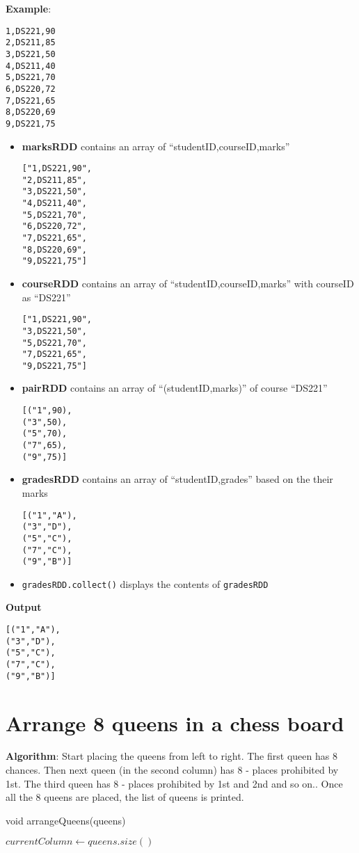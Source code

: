 \documentclass{article}
\begin{document}
\textbf{Example}:
\begin{verbatim}
1,DS221,90
2,DS211,85
3,DS221,50
4,DS211,40
5,DS221,70
6,DS220,72
7,DS221,65
8,DS220,69
9,DS221,75
\end{verbatim}

\begin{itemize}
\item \textbf{marksRDD} contains an array of ``studentID,courseID,marks''
\begin{verbatim}
["1,DS221,90",
"2,DS211,85",
"3,DS221,50",
"4,DS211,40",
"5,DS221,70",
"6,DS220,72",
"7,DS221,65",
"8,DS220,69",
"9,DS221,75"]
\end{verbatim}
\item \textbf{courseRDD} contains an array of ``studentID,courseID,marks'' with courseID as ``DS221''
\begin{verbatim}
["1,DS221,90",
"3,DS221,50",
"5,DS221,70",
"7,DS221,65",
"9,DS221,75"]
\end{verbatim}
\item \textbf{pairRDD} contains an array of ``(studentID,marks)'' of course ``DS221''
\begin{verbatim}
[("1",90),
("3",50),
("5",70),
("7",65),
("9",75)]
\end{verbatim}
\item \textbf{gradesRDD} contains an array of ``studentID,grades'' based on the their marks
\begin{verbatim}
[("1","A"),
("3","D"),
("5","C"),
("7","C"),
("9","B")]
\end{verbatim}
\item \verb~gradesRDD.collect()~ displays the contents of \verb~gradesRDD~
\end{itemize}
\textbf{Output}
\begin{verbatim}
[("1","A"),
("3","D"),
("5","C"),
("7","C"),
("9","B")]
\end{verbatim}

\pagebreak
\section{Arrange 8 queens in a chess board}
\label{sec:9}

\textbf{Algorithm}:
Start placing the queens from left to right. The first queen has 8 chances. Then next queen (in the second column) has 8 - places prohibited by 1st. The third queen has 8 - places prohibited by 1st and 2nd and so on.. Once all the 8 queens are placed, the list of queens is printed.\\
\begin{algorithm}[H]
  \caption{void arrangeQueens(queens)}\label{alg:9}
  \DontPrintSemicolon
  $currentColumn \gets queens.size()$\;
\end{algorithm}
\end{document}
